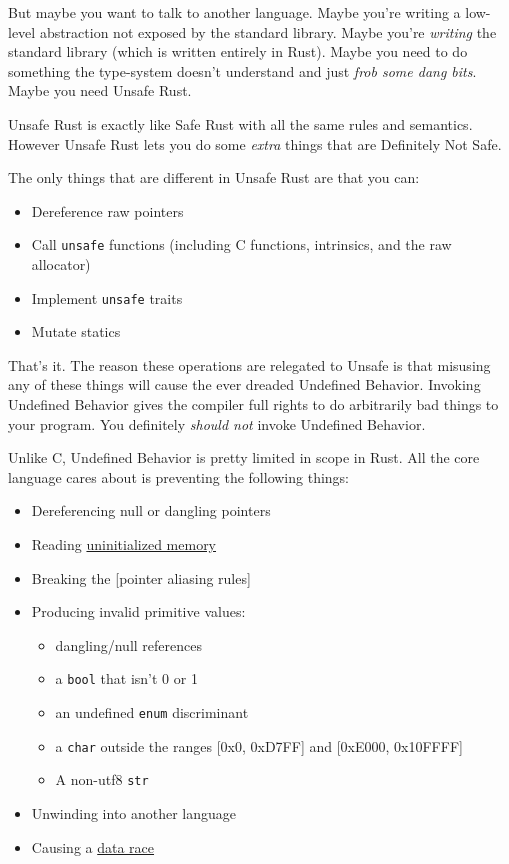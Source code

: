 \documentclass[a4paper,]{book}
\providecommand{\tightlist}{%
  \setlength{\itemsep}{0pt}\setlength{\parskip}{0pt}}
\begin{document}
But maybe you want to talk to another language. Maybe you're writing a
low-level abstraction not exposed by the standard library. Maybe you're
\emph{writing} the standard library (which is written entirely in Rust).
Maybe you need to do something the type-system doesn't understand and
just \emph{frob some dang bits}. Maybe you need Unsafe Rust.

Unsafe Rust is exactly like Safe Rust with all the same rules and
semantics. However Unsafe Rust lets you do some \emph{extra} things that
are Definitely Not Safe.

The only things that are different in Unsafe Rust are that you can:

\begin{itemize}
\tightlist
\item
  Dereference raw pointers
\item
  Call \texttt{unsafe} functions (including C functions, intrinsics, and
  the raw allocator)
\item
  Implement \texttt{unsafe} traits
\item
  Mutate statics
\end{itemize}

That's it. The reason these operations are relegated to Unsafe is that
misusing any of these things will cause the ever dreaded Undefined
Behavior. Invoking Undefined Behavior gives the compiler full rights to
do arbitrarily bad things to your program. You definitely \emph{should
not} invoke Undefined Behavior.

Unlike C, Undefined Behavior is pretty limited in scope in Rust. All the
core language cares about is preventing the following things:

\begin{itemize}
\tightlist
\item
  Dereferencing null or dangling pointers
\item
  Reading \protect\hyperlink{sec--uninitialized}{uninitialized memory}
\item
  Breaking the {[}pointer aliasing rules{]}
\item
  Producing invalid primitive values:

  \begin{itemize}
  \tightlist
  \item
    dangling/null references
  \item
    a \texttt{bool} that isn't 0 or 1
  \item
    an undefined \texttt{enum} discriminant
  \item
    a \texttt{char} outside the ranges {[}0x0, 0xD7FF{]} and {[}0xE000,
    0x10FFFF{]}
  \item
    A non-utf8 \texttt{str}
  \end{itemize}
\item
  Unwinding into another language
\item
  Causing a \protect\hyperlink{sec--races}{data race}
\end{itemize}
\end{document}
